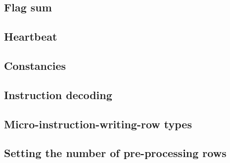 \subsection{Flag sum}                                       \label{mmu: generalities: flag sum}                                 
\subsection{Heartbeat}                                      \label{mmu: generalities: heartbeat}                                
\subsection{Constancies}                                    \label{mmu: generalities: constancies}                              
\subsection{Instruction decoding}                           \label{mmu: generalities: decoding}                                 
\subsection{Micro-instruction-writing-row types}            \label{mmu: generalities: row types}                                
\subsection{Setting the number of pre-processing rows}      \label{mmu: generalities: number of pre processing rows}            
